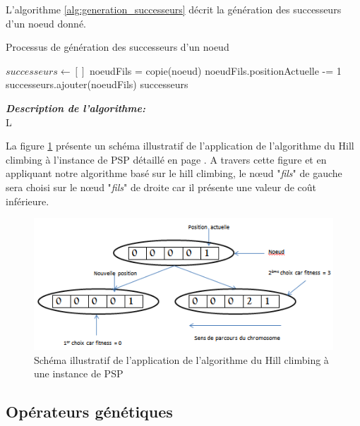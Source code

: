 	L'algorithme \ref{alg:generation_successeurs} décrit la génération des successeurs d'un noeud donné.
	\begin{algorithm}
		\caption{Processus de génération des successeurs d'un noeud}
		\label{alg:generation_successeurs}
 		\BlankLine
		\BlankLine 		
		$successeurs \gets []$
		\BlankLine
		{
			\BlankLine
			{
				\BlankLine
				noeudFils = copie(noeud)
				\BlankLine
				noeudFils.positionActuelle -= 1
				\BlankLine
				successeurs.ajouter(noeudFils)
				\BlankLine
			}
		}
	\Return successeurs
	\end{algorithm}	
	
	\hspace*{.5cm} \textbf{\textsl{Description de l'algorithme:}}\\	
	L
	
	\hspace*{.5cm} La figure \ref{fig:hill_climbing_fig} présente un schéma illustratif de l'application de l'algorithme du Hill climbing à l'instance de PSP détaillé en page \pageref{sec:problem_description}. A travers cette figure et en appliquant notre algorithme basé sur le hill climbing, le nœud "\emph{fils}" de gauche sera choisi sur le nœud "\emph{fils}"  de droite car il présente une valeur de coût inférieure.
	
	\begin{figure}[!h]
			\begin{center}
				\includegraphics[scale=.7]{images/hill_climbing_fig.png}
				\caption{Schéma illustratif de l'application de l'algorithme du Hill climbing à une instance de PSP}
				\label{fig:hill_climbing_fig}
			\end{center}
	\end{figure}
	
	\subsection{Opérateurs génétiques}
